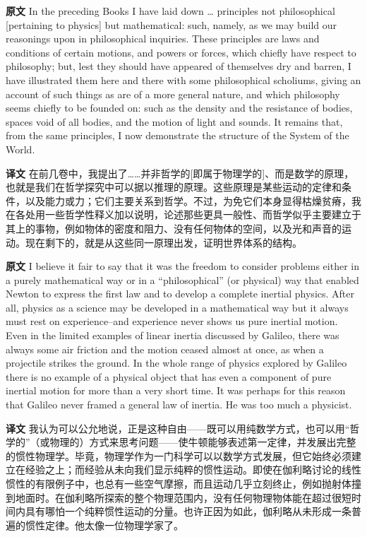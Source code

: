 \documentclass[UTF8,zihao=-4]{ctexart}
\newcommand{\BodyFont}{\fontsize{10.5pt}{15.5pt}\selectfont}
\renewenvironment{quote}{\par\noindent\begingroup\BodyFont}{\par\endgroup}
\begin{document}
\begin{quote}
\noindent\textbf{原文} In the preceding Books I have laid down \ldots{} principles not philosophical [pertaining to physics] but mathematical: such, namely, as we may build our reasonings upon in philosophical inquiries. These principles are laws and conditions of certain motions, and powers or forces, which chiefly have respect to philosophy; but, lest they should have appeared of themselves dry and barren, I have illustrated them here and there with some philosophical scholiums, giving an account of such things as are of a more general nature, and which philosophy seems chiefly to be founded on: such as the density and the resistance of bodies, spaces void of all bodies, and the motion of light and sounds. It remains that, from the same principles, I now demonstrate the structure of the System of the World.
\par\noindent\textbf{译文} 在前几卷中，我提出了……并非哲学的[即属于物理学的]、而是数学的原理，也就是我们在哲学探究中可以据以推理的原理。这些原理是某些运动的定律和条件，以及能力或力；它们主要关系到哲学。不过，为免它们本身显得枯燥贫瘠，我在各处用一些哲学性释义加以说明，论述那些更具一般性、而哲学似乎主要建立于其上的事物，例如物体的密度和阻力、没有任何物体的空间，以及光和声音的运动。现在剩下的，就是从这些同一原理出发，证明世界体系的结构。
\end{quote}

\noindent\textbf{原文} I believe it fair to say that it was the freedom to consider problems either in a purely mathematical way or in a ``philosophical'' (or physical) way that enabled Newton to express the first law and to develop a complete inertial physics. After all, physics as a science may be developed in a mathematical way but it always must rest on experience--and experience never shows us pure inertial motion. Even in the limited examples of linear inertia discussed by Galileo, there was always some air friction and the motion ceased almost at once, as when a projectile strikes the ground. In the whole range of physics explored by Galileo there is no example of a physical object that has even a component of pure inertial motion for more than a very short time. It was perhaps for this reason that Galileo never framed a general law of inertia. He was too much a physicist.
\par\noindent\textbf{译文} 我认为可以公允地说，正是这种自由——既可以用纯数学方式，也可以用“哲学的”（或物理的）方式来思考问题——使牛顿能够表述第一定律，并发展出完整的惯性物理学。毕竟，物理学作为一门科学可以以数学方式发展，但它始终必须建立在经验之上；而经验从未向我们显示纯粹的惯性运动。即使在伽利略讨论的线性惯性的有限例子中，也总有一些空气摩擦，而且运动几乎立刻终止，例如抛射体撞到地面时。在伽利略所探索的整个物理范围内，没有任何物理物体能在超过很短时间内具有哪怕一个纯粹惯性运动的分量。也许正因为如此，伽利略从未形成一条普遍的惯性定律。他太像一位物理学家了。
\medskip
\end{document}
